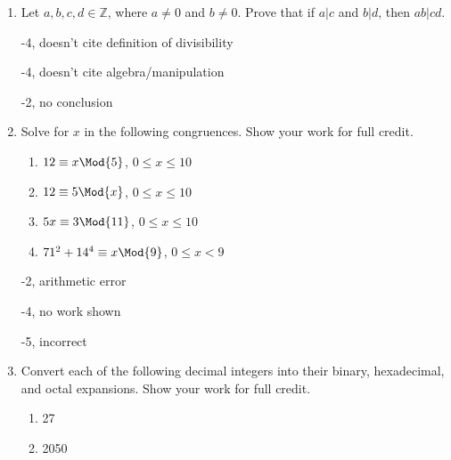\begin{enumerate}

















    



\item Let $a,b,c,d \in \mathbb{Z}$, where $a \neq 0$ and $b \neq 0$. Prove that if $a|c$ and $b|d$, then $ab|cd$. 

\begin{rubric}
-4, doesn't cite definition of divisibility

-4, doesn't cite algebra/manipulation

-2, no conclusion
\end{rubric}

\item Solve for $x$ in the following congruences. Show your work for full credit. 
\begin{enumerate}
    \item $12 \equiv x \Mod{5}$, $0 \leq x \leq 10$
    \item $12 \equiv 5 \Mod{x}$, $0 \leq x \leq 10$
    \item $5x \equiv 3\Mod{11}$, $0 \leq x \leq 10$
    \item $71^2 + 14^4 \equiv x\Mod{9}$, $0 \leq x < 9$
\end{enumerate}

\begin{rubric}
-2, arithmetic error

-4, no work shown

-5, incorrect
\end{rubric}

\item Convert each of the following decimal integers into their binary, hexadecimal, and octal expansions. Show your work for full credit. 
\begin{enumerate}
    \item 27
    \item 2050
\end{enumerate}


\end{enumerate}
